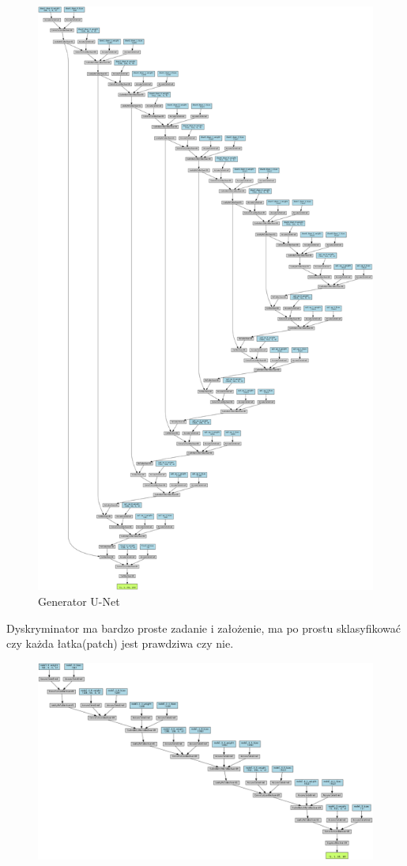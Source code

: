 \documentclass[12pt]{article}
\begin{document}
\begin{sloppypar}
{{\begin{figure}[H]
      \includegraphics[width=\textwidth,height=\textheight,keepaspectratio]{generator.png}
      \caption{Generator U-Net}
      \label{fig:u-net}
    \end{figure}
    Dyskryminator ma bardzo proste zadanie i założenie, ma po prostu sklasyfikować czy każda łatka(patch) jest prawdziwa czy nie.\cite{pix2pix-tf}
    \begin{figure}[H]
      \centering
      \includegraphics[width=\textwidth,height=\textheight,keepaspectratio]{discriminator.png}

\end{figure}}}
\end{sloppypar}
\end{document}
